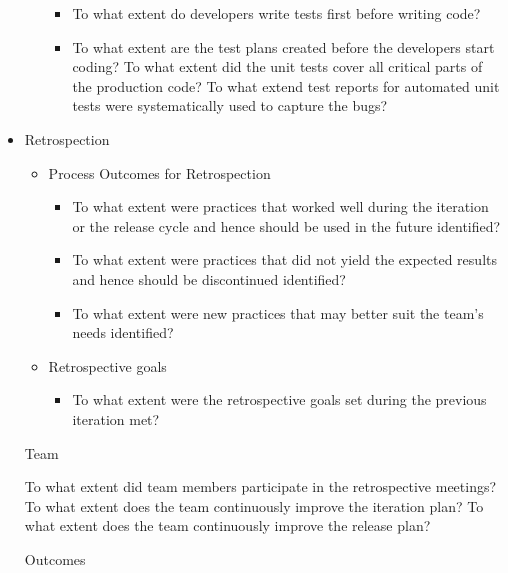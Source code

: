\begin{appendices}
\begin{itemize}
\begin{itemize}
				\begin{itemize}
					\item To what extent do developers write tests first before writing code?
					\item To what extent are the test plans created before the developers start coding?
					\addition To what extent did the unit tests cover all critical parts of the production code?
					\addition To what extend test reports for automated unit tests were systematically used to capture the bugs?
				\end{itemize}
		\end{itemize}
	\item Retrospection
		\begin{itemize}
			\item Process Outcomes for Retrospection
				\begin{itemize}
					\item To what extent were practices that worked well during the iteration or the release cycle and hence should be used in the future identified?
					\item To what extent were practices that did not yield the expected results and hence should be discontinued identified?
					\item To what extent were new practices that may better suit the team's needs identified?
				\end{itemize}
		\end{itemize}
		\begin{itemize}
			\item Retrospective goals
				\begin{itemize}
					\item To what extent were the retrospective goals set during the previous iteration met?
				\end{itemize}
		\end{itemize}
		\begin{itemize}
			\addition Team
				\begin{itemize}
					\addition To what extent did team members participate in the retrospective meetings?
					\addition To what extent does the team continuously improve the iteration plan?
					\addition To what extent does the team continuously improve the release plan?
				\end{itemize}
		\end{itemize}
		\begin{itemize}
			\addition Outcomes

\end{itemize}
\end{itemize}
\end{appendices}
